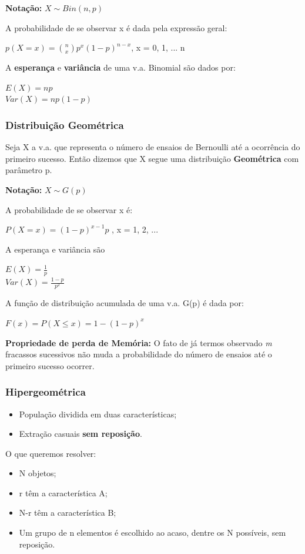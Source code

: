 \documentclass[a4paper, 12pt]{article}
\begin{document}
	\textbf{Notação:} $X \sim Bin(n,p)$
		
	A probabilidade de se observar x é dada pela expressão geral:	
	\begin{center}
		\LARGE
		$p(X = x) = {n \choose x}p^{x}(1-p)^{n-x}$, x = 0, 1, ... n
	\end{center}
	A \textbf{esperança} e \textbf{variância} de uma v.a. Binomial são dados por:
	\begin{center}
		\LARGE
		$E(X) = np$\\
		$Var(X) = np(1-p)$
	\end{center}
	
\subsubsection{Distribuição Geométrica}
	Seja X a v.a. que representa o número de ensaios de Bernoulli até a ocorrência do primeiro sucesso. Então dizemos que X segue uma distribuição \textbf{Geométrica} com parâmetro p.
	
	\textbf{Notação:} $X\sim G(p)$	
	
	A probabilidade de se observar x é:
	\begin{center}
		\LARGE
		$P(X = x) = (1-p)^{x-1}p$ , x = 1, 2, ...
	\end{center}
	A esperança e variância são
	\begin{center}
		\LARGE
		$E(X) = \frac{1}{p}$\\ $Var(X) = \frac{1-p}{p^{2}}$
	\end{center}
	A função de distribuição acumulada de uma v.a. G(p) é dada por:
	\begin{center}
		\LARGE
		$F(x) = P(X\leq x) = 1-(1-p)^{x}$
	\end{center}
	\textbf{Propriedade de perda de Memória:} O fato de já termos observado \textit{m} fracassos sucessivos não muda a probabilidade do número de ensaios até o primeiro sucesso ocorrer.

\subsubsection{Hipergeométrica}
	\begin{itemize}
		\item População dividida em duas características;
		\item Extração casuais \textbf{sem reposição}.
	\end{itemize}
	
	O que queremos resolver:
	\begin{itemize}
		\item N objetos;
		\item r têm a característica A;
		\item N-r têm a característica B;
		\item Um grupo de n elementos é escolhido ao acaso, dentre os N possíveis, sem reposição.
	\end{itemize}
	
\end{document}
